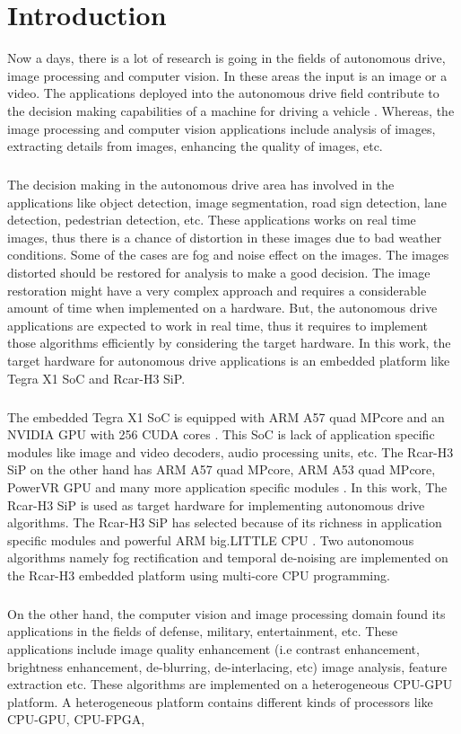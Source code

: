 \chapter{Introduction}
Now a days, there is a lot of research is going in the fields of autonomous drive, image processing and computer vision. In these areas the input is an image or a video. The applications deployed into the autonomous drive field contribute to the decision making capabilities of a machine for driving a vehicle \cite{CUDAscalable}. Whereas, the image processing and computer vision applications include analysis of images, extracting details from images, enhancing the quality of images, etc. \paragraph*{}The decision making in the autonomous drive area has involved in the applications like  object detection, image segmentation, road sign detection, lane detection, pedestrian detection, etc. These applications works on real time images, thus there is a chance of distortion in these images due to bad weather conditions. Some of the cases are fog and noise effect on the images. The images distorted should be restored for analysis to make a good decision. The image restoration might have a very complex approach and requires a considerable amount of time when implemented on a hardware. But, the autonomous drive applications are expected to work in real time, thus it requires to implement those algorithms efficiently by considering the target hardware. In this work, the target hardware for autonomous drive applications is an embedded platform like Tegra X1 SoC and Rcar-H3 SiP. \paragraph*{}The embedded Tegra X1 SoC is equipped with ARM A57 quad MPcore and an NVIDIA GPU with 256 CUDA cores \cite{tegra}. This SoC is lack of application specific modules like image and video decoders, audio processing units, etc. The Rcar-H3 SiP on the other hand has ARM A57 quad MPcore, ARM A53 quad MPcore, PowerVR GPU and many more application specific modules \cite{rcar}. In this work, The Rcar-H3 SiP is used as target hardware for implementing autonomous drive algorithms. The Rcar-H3 SiP has selected because of its richness in application specific modules and powerful ARM big.LITTLE CPU \cite{biglittle}. Two autonomous algorithms namely fog rectification and temporal de-noising are implemented on the Rcar-H3 embedded platform using multi-core CPU programming.\paragraph*{}On the other hand, the computer vision and image processing domain found its applications in the fields of defense, military, entertainment, etc. These applications include image quality enhancement (i.e contrast enhancement, brightness enhancement, de-blurring, de-interlacing, etc)  image analysis, feature extraction etc. These algorithms are implemented on a heterogeneous CPU-GPU platform. A heterogeneous platform contains different kinds of processors like CPU-GPU, CPU-FPGA, 